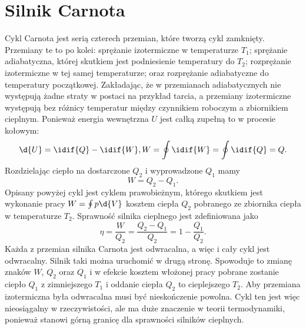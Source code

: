 \section{Silnik Carnota}
Cykl Carnota jest serią czterech przemian, które tworzą cykl zamknięty. Przemiany te to po kolei: sprężanie izotermiczne w temperaturze $T_1$; sprężanie adiabatyczna, której skutkiem jest podniesienie temperatury do $T_2$; rozprężanie izotermiczne w tej samej temperaturze; oraz rozprężanie adiabatyczne do temperatury początkowej. Zakładając, że w przemianach adiabatycznych nie występują żadne straty w postaci na przykład tarcia, a przemiany izotermiczne występują bez różnicy temperatur między czynnikiem roboczym a zbiornikiem cieplnym. Ponieważ energia wewnętrzna $U$ jest całką zupełną to w procesie kołowym:
\begin{gather}
\d{U} = \idif{Q} - \idif{W},
W = \oint \idif{W} = \oint \idif{Q} = Q.
\end{gather}
Rozdzielając ciepło na dostarczone $Q_2$ i wyprowadzone $Q_1$ mamy
\begin{equation}
W = Q_2 - Q_1.
\end{equation}
Opisany powyżej cykl jest cyklem prawobieżnym, którego skutkiem jest wykonanie pracy $W = \oint p \d{V}$ kosztem ciepła $Q_2$ pobranego ze zbiornika ciepła w temperaturze $T_2$. 
Sprawność silnika cieplnego jest zdefiniowana jako
\begin{equation}\label{eq:def_sprawnosc_silnika}
\eta = \frac{W}{Q_2} = \frac{Q_2 - Q_1}{Q_2} = 1 - \frac{Q_1}{Q_2}.
\end{equation}
Każda z przemian silnika Carnota jest odwracalna, a więc i cały cykl jest odwracalny. Silnik taki można uruchomić w drugą stronę. Spowoduje to zmianę znaków $W$, $Q_2$ oraz $Q_1$ i w efekcie kosztem włożonej pracy pobrane zostanie ciepło $Q_1$ z zimniejszego $T_1$ i oddanie ciepła $Q_2$ to cieplejszego $T_2$. Aby przemiana izotermiczna była odwracalna musi być nieskończenie powolna. Cykl ten jest więc nieosiągalny w rzeczywistości, ale ma duże znaczenie w teorii termodynamiki, ponieważ stanowi górną granicę dla sprawności silników cieplnych.
